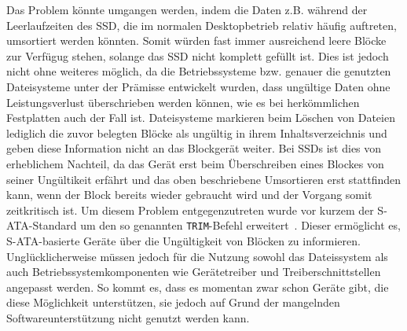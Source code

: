 Das Problem könnte umgangen werden, indem die Daten z.B. während der Leerlaufzeiten des \ac{SSD}, die im normalen Desktopbetrieb relativ häufig auftreten,
umsortiert werden könnten. Somit würden fast immer ausreichend leere Blöcke zur Verfügug stehen, solange das \ac{SSD} nicht komplett gefüllt ist. Dies ist jedoch
nicht ohne weiteres möglich, da die Betriebssysteme bzw. genauer die genutzten Dateisysteme unter der Prämisse entwickelt wurden, dass ungültige Daten ohne
Leistungsverlust überschrieben werden können, wie es bei herkömmlichen Festplatten auch der Fall ist. Dateisysteme markieren beim Löschen von Dateien lediglich
die zuvor belegten Blöcke als ungültig in ihrem Inhaltsverzeichnis und geben diese Information nicht an das Blockgerät weiter. Bei \acp{SSD} ist dies von
erheblichem Nachteil, da das Gerät erst beim Überschreiben eines Blockes von seiner Ungültikeit erfährt und das oben beschriebene Umsortieren erst stattfinden
kann, wenn der Block bereits wieder gebraucht wird und der Vorgang somit zeitkritisch ist. Um diesem Problem entgegenzutreten wurde vor kurzem der
\mbox{S-ATA}-Standard um den so genannten \texttt{TRIM}-Befehl erweitert~\cite{acs2}. Dieser ermöglicht es, \mbox{S-ATA}-basierte Geräte über die
Ungültigkeit von Blöcken zu informieren. Unglücklicherweise müssen jedoch für die Nutzung sowohl das Dateissystem als auch Betriebssystemkomponenten wie
Gerätetreiber und Treiberschnittstellen angepasst werden. So kommt es, dass es momentan zwar schon Geräte gibt, die diese Möglichkeit unterstützen, sie jedoch
auf Grund der mangelnden Softwareunterstützung nicht genutzt werden kann.